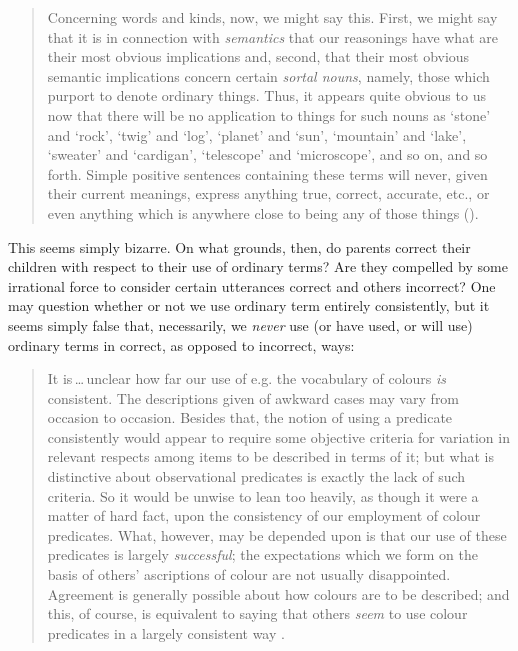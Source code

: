 \documentclass[11pt]{standalone} \newif\ifstandlone \standalonetrue
\newenvironment{squote}{%
	\begin{quote}\begin{singlespace}%
	}{%
	\end{singlespace}\end{quote}}
\begin{document}
\begin{spacing}{1.5}
\begin{squote}
Concerning words and kinds, now, we might say this.  First, we might
say that it is in connection with \emph{semantics} that our reasonings have
what are their most obvious implications and, second, that their most
obvious semantic implications concern certain \emph{sortal nouns}, namely,
those which purport to denote ordinary things.  Thus, it appears quite
obvious to us now that there will be no application to things for such
nouns as `stone' and `rock', `twig' and `log', `planet' and `sun',
`mountain' and `lake', `sweater' and `cardigan', `telescope' and
`microscope', and so on, and so forth.  Simple positive sentences
containing these terms will never, given their current meanings,
express anything true, correct, accurate, etc., or even anything which
is anywhere close to being any of those things
(\citeyear[148]{unger1979}).
\end{squote}

This seems simply bizarre.  On what grounds, then, do parents correct
their children with respect to their use of ordinary terms?  Are they
compelled by some irrational force to consider certain utterances
correct and others incorrect?  One may question whether or not we use
ordinary term entirely consistently, but it seems simply false that,
necessarily, we {\em never} use (or have used, or will use) ordinary
terms in correct, as opposed to incorrect, ways:

\begin{squote}
It is\,\ldots\,unclear how far our use of e.g. the vocabulary of
colours \emph{is} consistent.  The descriptions given of awkward cases
may vary from occasion to occasion.  Besides that, the notion of using
a predicate consistently would appear to require some objective
criteria for variation in relevant respects among items to be
described in terms of it; but what is distinctive about observational
predicates is exactly the lack of such criteria.  So it would be
unwise to lean too heavily, as though it were a matter of hard fact,
upon the consistency of our employment of colour predicates.  What,
however, may be depended upon is that our use of these predicates is
largely \emph{successful}; the expectations which we form on the basis
of others' ascriptions of colour are not usually disappointed.
Agreement is generally possible about how colours are to be described;
and this, of course, is equivalent to saying that others \emph{seem}
to use colour predicates in a largely consistent way
\citep[361]{wright1975}.
\end{squote}


\end{spacing}
\end{document}
